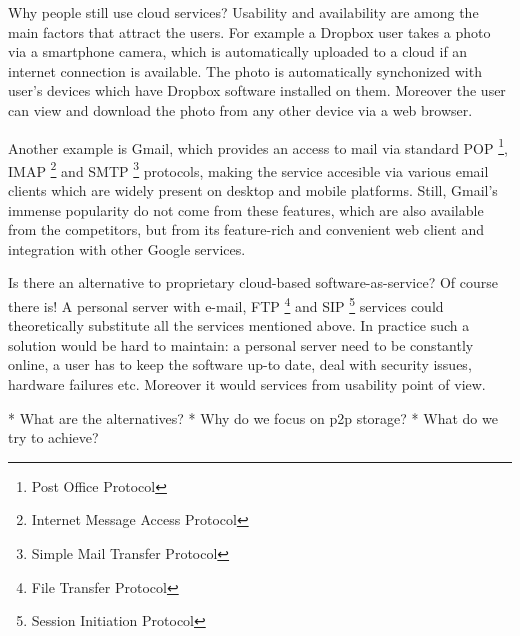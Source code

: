 Why people still use cloud services? Usability and availability are
among the main factors that attract the users. For example a Dropbox
user takes a photo via a smartphone camera, which is automatically
uploaded to a cloud if an internet connection is available.
The photo is automatically synchonized with user's devices which
have Dropbox software installed on them. Moreover the user can
view and download the photo from any other device via a web browser.

Another example is Gmail, which provides an access to mail via
standard
POP \footnote{Post Office Protocol},
IMAP \footnote{Internet Message Access Protocol}
and SMTP \footnote{Simple Mail Transfer Protocol}
protocols, making the service accesible
via various email clients which are widely present on desktop
and mobile platforms. Still, Gmail's immense popularity
\cite{gmail-popularity}
do not come from these features, which are also available
from the competitors, but from its feature-rich and convenient
web client and integration with other Google services.

Is there an alternative to proprietary cloud-based
software-as-service?
Of course there is! A personal server with e-mail,
FTP \footnote{File Transfer Protocol} and
SIP \footnote{Session Initiation Protocol}
services could theoretically substitute all the services
mentioned above. In practice such a solution would be hard to maintain:
a personal server need to be constantly online, a user has to keep
the software up-to date, deal with security issues, hardware failures
etc. Moreover it would 
services from usability point of view. 



* What are the alternatives?
* Why do we focus on p2p storage?
* What do we try to achieve?
